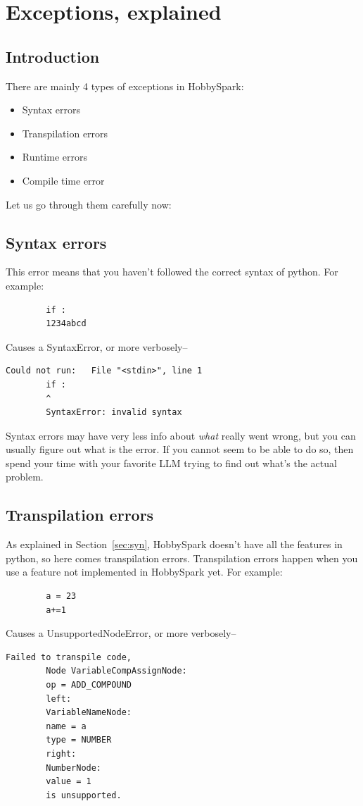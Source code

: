 	\chapter{Exceptions, explained}
	\section{Introduction}
	There are mainly 4 types of exceptions in HobbySpark:
	\begin{itemize}
		\item Syntax errors
		\item Transpilation errors
		\item Runtime errors
		\item Compile time error
	\end{itemize}
	
	Let us go through them carefully now:
	
	\section{Syntax errors}
	This error means that you haven't followed the correct syntax of python. For example:
	\begin{lstlisting}
		if :
		1234abcd
	\end{lstlisting}
	Causes a SyntaxError, or more verbosely--
	\begin{lstlisting}[style=tracebacks]
		Could not run:   File "<stdin>", line 1
		if :
		^
		SyntaxError: invalid syntax
	\end{lstlisting}
	
	\begin{notebox}
		Syntax errors may have very less info about \emph{what} really went wrong, but you can usually figure out what is the error. If you cannot seem to be able to do so, then spend your time with your favorite LLM trying to find out what's the actual problem.
	\end{notebox}
	\newpage
	\section{Transpilation errors}
	As explained in Section~\ref{sec:syn}, HobbySpark doesn't have all the features in python, so here comes transpilation errors. Transpilation errors happen when you use a feature not implemented in HobbySpark yet. For example:
	\begin{lstlisting}
		a = 23
		a+=1
	\end{lstlisting}
	Causes a UnsupportedNodeError, or more verbosely--
	\begin{lstlisting}[style=tracebacks]
		Failed to transpile code, 
		Node VariableCompAssignNode:
		op = ADD_COMPOUND
		left:
		VariableNameNode:
		name = a
		type = NUMBER
		right:
		NumberNode:
		value = 1
		is unsupported.
	\end{lstlisting}
	
